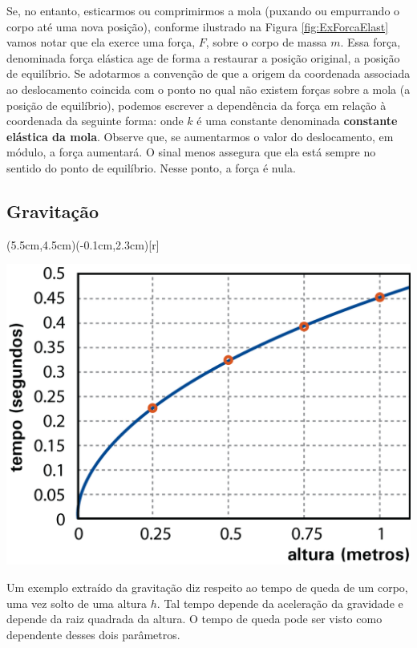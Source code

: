 \documentclass[../main.tex]{subfiles}
\begin{document}
\noindent Se, no entanto, esticarmos ou comprimirmos a mola (puxando ou empurrando o corpo até uma nova posição), conforme ilustrado na Figura \ref{fig:ExForcaElast} vamos notar que ela exerce uma força, $F$, sobre o corpo de massa $m$. Essa força, denominada força elástica age de forma a restaurar a posição original, a posição de equilíbrio. Se adotarmos a convenção de que a origem da coordenada associada ao deslocamento coincida com o ponto no qual não existem forças sobre a mola (a posição de equilíbrio), podemos 
escrever a dependência da força em relação à coordenada da seguinte forma:
onde $k$ é uma constante denominada \textbf{constante elástica da mola}. Observe que, se aumentarmos o valor do deslocamento, em módulo, a força aumentará. O sinal menos assegura que ela está sempre no sentido do ponto de equilíbrio. Nesse ponto, a força é nula.
\subsection{Gravitação}
\pichskip{0.5cm}%
\parpic(5.5cm,4.5cm)(-0.1cm,2.3cm)[r]{%
\begin{minipage}{0.3\textwidth}
\includegraphics[scale=0.2]{fig_func/Gravitação}
\vspace{-0.9cm}
%
\label{fig:ExGravitação}
\end{minipage}
}
\noindent Um exemplo extraído da gravitação diz respeito ao tempo de queda de um corpo, uma 
vez solto de uma altura $h$. Tal tempo depende da aceleração da gravidade e depende da raiz 
quadrada da altura. O tempo de queda pode ser visto como dependente desses dois parâmetros. 
\end{document}
